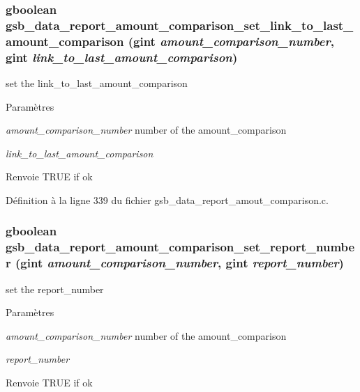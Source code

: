 \subsubsection[{gsb\_\-data\_\-report\_\-amount\_\-comparison\_\-set\_\-link\_\-to\_\-last\_\-amount\_\-comparison}]{\setlength{\rightskip}{0pt plus 5cm}gboolean gsb\_\-data\_\-report\_\-amount\_\-comparison\_\-set\_\-link\_\-to\_\-last\_\-amount\_\-comparison (gint {\em amount\_\-comparison\_\-number}, \/  gint {\em link\_\-to\_\-last\_\-amount\_\-comparison})}\label{gsb__data__report__amout__comparison_8c_ab8f7b5f344f111a9b4aee3715c2c3935}
set the link\_\-to\_\-last\_\-amount\_\-comparison


\begin{DoxyParams}{Paramètres}
\item[{\em amount\_\-comparison\_\-number}]number of the amount\_\-comparison \item[{\em link\_\-to\_\-last\_\-amount\_\-comparison}]\end{DoxyParams}
\begin{DoxyReturn}{Renvoie}
TRUE if ok 
\end{DoxyReturn}


Définition à la ligne 339 du fichier gsb\_\-data\_\-report\_\-amout\_\-comparison.c.

\subsubsection[{gsb\_\-data\_\-report\_\-amount\_\-comparison\_\-set\_\-report\_\-number}]{\setlength{\rightskip}{0pt plus 5cm}gboolean gsb\_\-data\_\-report\_\-amount\_\-comparison\_\-set\_\-report\_\-number (gint {\em amount\_\-comparison\_\-number}, \/  gint {\em report\_\-number})}\label{gsb__data__report__amout__comparison_8c_ab8582868812aa6de911a6c955057fbd2}
set the report\_\-number


\begin{DoxyParams}{Paramètres}
\item[{\em amount\_\-comparison\_\-number}]number of the amount\_\-comparison \item[{\em report\_\-number}]\end{DoxyParams}
\begin{DoxyReturn}{Renvoie}
TRUE if ok 
\end{DoxyReturn}


